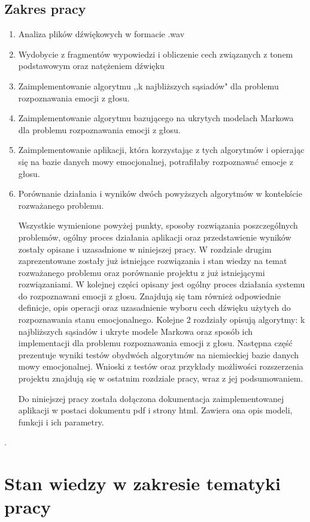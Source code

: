 \documentclass[declaration,shortabstract]{iithesis}
\begin{document}
\section{Zakres pracy}
\begin{enumerate}
\item Analiza plików dźwiękowych w formacie .wav
\item Wydobycie z fragmentów wypowiedzi i obliczenie cech związanych z tonem podstawowym oraz natężeniem dźwięku
\item Zaimplementowanie algorytmu ,,k najbliższych sąsiadów" dla problemu rozpoznawania emocji z głosu.
\item Zaimplementowanie algorytmu bazującego na ukrytych modelach Markowa dla problemu rozpoznawania emocji z głosu.
\item Zaimplementowanie aplikacji, która korzystając z tych algorytmów i opierając się na bazie danych mowy emocjonalnej, potrafiłaby rozpoznawać emocje z głosu.
\item Porównanie działania i wyników dwóch powyższych algorytmów w kontekście rozważanego problemu.

Wszystkie wymienione powyżej punkty, sposoby rozwiązania poszczególnych problemów, ogólny proces działania aplikacji oraz przedstawienie wyników zostały opisane i uzasadnione w niniejszej pracy. W rozdziale drugim zaprezentowane zostały już istniejące rozwiązania i stan wiedzy na temat rozważanego problemu oraz porównanie projektu z już istniejącymi rozwiązaniami. W kolejnej części opisany jest ogólny proces działania systemu do rozpoznawani emocji z głosu. Znajdują się tam również odpowiednie definicje, opis operacji oraz uzasadnienie wyboru cech dźwięku użytych do rozpoznawania stanu emocjonalnego. Kolejne 2 rozdziały opisują algorytmy: k najbliższych sąsiadów i ukryte modele Markowa oraz sposób ich implementacji dla problemu rozpoznawania emocji z głosu. Następna część prezentuje wyniki testów obydwóch algorytmów na niemieckiej bazie danych mowy emocjonalnej. Wnioski z testów oraz przykłady możliwości rozszerzenia projektu znajdują się w ostatnim rozdziale pracy, wraz z jej podsumowaniem.

Do niniejszej pracy została dołączona dokumentacja zaimplementowanej aplikacji w postaci dokumentu pdf i strony html. Zawiera ona opis modeli, funkcji i ich parametry.
\end{enumerate}.

\chapter{Stan wiedzy w zakresie tematyki pracy}
\end{document}

